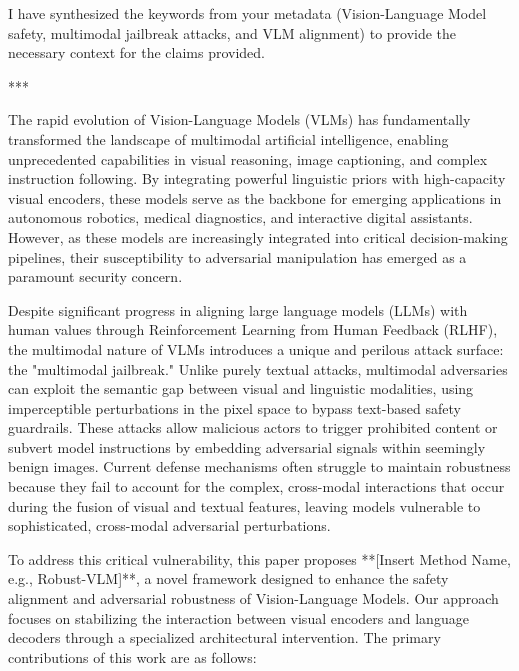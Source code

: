 \documentclass[11pt,a4paper]{article}
\begin{document}
I have synthesized the keywords from your metadata (Vision-Language Model safety, multimodal jailbreak attacks, and VLM alignment) to provide the necessary context for the claims provided.

***


The rapid evolution of Vision-Language Models (VLMs) has fundamentally transformed the landscape of multimodal artificial intelligence, enabling unprecedented capabilities in visual reasoning, image captioning, and complex instruction following. By integrating powerful linguistic priors with high-capacity visual encoders, these models serve as the backbone for emerging applications in autonomous robotics, medical diagnostics, and interactive digital assistants. However, as these models are increasingly integrated into critical decision-making pipelines, their susceptibility to adversarial manipulation has emerged as a paramount security concern.

Despite significant progress in aligning large language models (LLMs) with human values through Reinforcement Learning from Human Feedback (RLHF), the multimodal nature of VLMs introduces a unique and perilous attack surface: the "multimodal jailbreak." Unlike purely textual attacks, multimodal adversaries can exploit the semantic gap between visual and linguistic modalities, using imperceptible perturbations in the pixel space to bypass text-based safety guardrails. These attacks allow malicious actors to trigger prohibited content or subvert model instructions by embedding adversarial signals within seemingly benign images. Current defense mechanisms often struggle to maintain robustness because they fail to account for the complex, cross-modal interactions that occur during the fusion of visual and textual features, leaving models vulnerable to sophisticated, cross-modal adversarial perturbations.

To address this critical vulnerability, this paper proposes **[Insert Method Name, e.g., Robust-VLM]**, a novel framework designed to enhance the safety alignment and adversarial robustness of Vision-Language Models. Our approach focuses on stabilizing the interaction between visual encoders and language decoders through a specialized architectural intervention. The primary contributions of this work are as follows:
\end{document}
